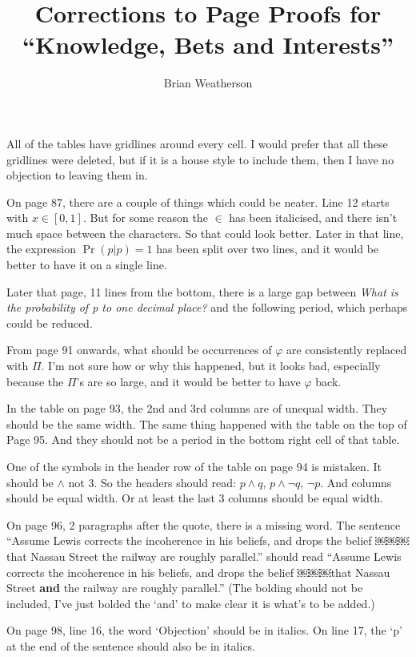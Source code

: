 \documentclass[]{article}
\title{Corrections to Page Proofs for ``Knowledge, Bets and Interests''}
\author{Brian Weatherson}
\begin{document}
\maketitle

All of the tables have gridlines around every cell. I would prefer that all these gridlines were deleted, but if it is a house style to include them, then I have no objection to leaving them in.

On page 87, there are a couple of things which could be neater. Line 12 starts with $x \in [0,1]$. But for some reason the $\in$ has been italicised, and there isn't much space between the characters. So that could look better. Later in that line, the expression $\Pr(p|p) = 1$ has been split over two lines, and it would be better to have it on a single line.

Later that page, 11 lines from the bottom, there is a large gap between \textit{What is the probability of p to one decimal place?} and the following period, which perhaps could be reduced.

From page 91 onwards, what should be occurrences of $\varphi$ are consistently replaced with $\Pi$. I'm not sure how or why this happened, but it looks bad, especially because the $\Pi$'s are so large, and it would be better to have $\varphi$ back.

In the table on page 93, the 2nd and 3rd columns are of unequal width. They should be the same width.  The same thing happened with the table on the top of Page 95.  And they should not be a period in the bottom right cell of that table.

One of the symbols in the header row of the table on page 94 is mistaken. It should be $\wedge$ not $3$. So the headers should read: $p \wedge q$, $p \wedge \neg q$, $\neg p$.  And columns should be equal width. Or at least the last 3 columns should be equal width.

On page 96, 2 paragraphs after the quote, there is a missing word. The sentence ``Assume Lewis corrects the incoherence in his beliefs, and drops the belief ￼￼￼that Nassau Street the railway are roughly parallel.'' should read ``Assume Lewis corrects the incoherence in his beliefs, and drops the belief ￼￼￼that Nassau Street \textbf{and} the railway are roughly parallel.'' (The bolding should not be included, I've just bolded the `and' to make clear it is what's to be added.)

On page 98, line 16, the word `Objection' should be in italics.  On line 17, the `p'  at the end of the sentence should also be in italics.
\end{document}
